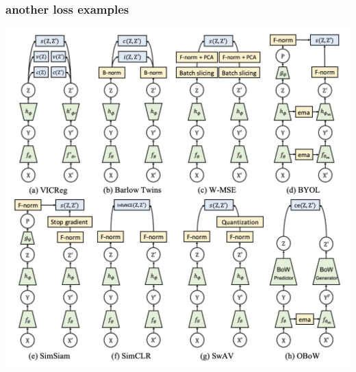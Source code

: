 \documentclass{beamer}
\begin{document}
\begin{frame}
  \frametitle{another loss examples}

  \centering
  \includegraphics[scale=0.3]{../images/self_supervised_loss.png}
     
\end{frame}
\end{document}
